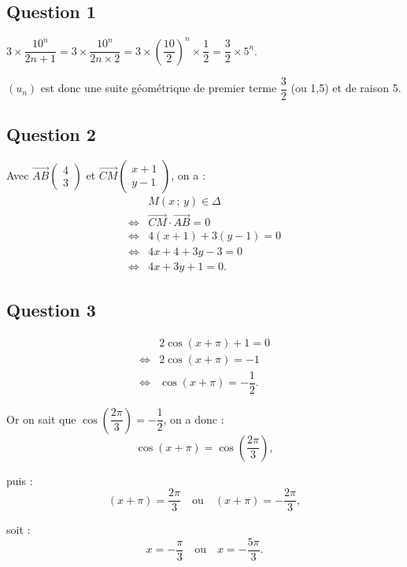 \subsection*{Question 1}

\(3 \times \dfrac{10^n}{2n+1} = 3 \times \dfrac{10^n}{2n \times 2} = 3 \times \left(\dfrac{10}{2}\right)^n \times \dfrac{1}{2} = \dfrac{3}{2} \times 5^n\).

\((u_n)\) est donc une suite géométrique de premier terme \(\dfrac{3}{2}\) (ou 1,5) et de raison 5.

\subsection*{Question 2}

Avec \(\overrightarrow{AB} \begin{pmatrix} 4 \\ 3 \end{pmatrix}\) et \(\overrightarrow{CM} \begin{pmatrix} x + 1 \\ y - 1 \end{pmatrix}\), on a :
\begin{align*}
&M(x\,;\,y) \in \Delta \\
\iff &\overrightarrow{CM} \cdot \overrightarrow{AB} = 0 \\
\iff &4(x + 1) + 3(y - 1) = 0 \\
\iff &4x + 4 + 3y - 3 = 0 \\
\iff &4x + 3y + 1 = 0.
\end{align*}

\subsection*{Question 3}

\begin{align*}
&2\cos(x + \pi) + 1 = 0 \\
\iff &2\cos(x + \pi) = -1 \\
\iff &\cos(x + \pi) = -\dfrac{1}{2}.
\end{align*}

Or on sait que \(\cos\left(\dfrac{2\pi}{3}\right) = -\dfrac{1}{2}\), on a donc :
\[
\cos(x + \pi) = \cos\left(\dfrac{2\pi}{3}\right),
\]

puis :
\[
(x + \pi) = \dfrac{2\pi}{3} \quad \text{ou} \quad (x + \pi) = -\dfrac{2\pi}{3},
\]

soit :
\[
x = -\dfrac{\pi}{3} \quad \text{ou} \quad x = -\dfrac{5\pi}{3}.
\]

